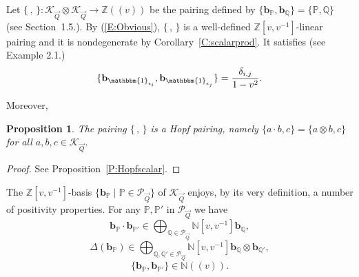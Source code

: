 \documentclass[a4paper,10pt]{amsart}
\def\Z{\mathbb{Z}}
\def\N{\mathbb{N}}
\newtheorem{prop}[theo]{Proposition}
\numberwithin{equation}{section}
\begin{document}
\vspace{.1in}

Let $\{\,,\,\}: \mathcal{K}_{\vec{Q}} \otimes \mathcal{K}_{\vec{Q}} \to \Z((v))$ be the pairing defined by $\{\mathbf{b}_{\mathbb{P}}, \mathbf{b}_{\mathbb{Q}}\}=\{\mathbb{P}, \mathbb{Q}\}$ (see Section~1.5.). By (\ref{E:Obvious}), $\{\,,\,\}$ is a well-defined $\Z[v,v^{-1}]$-linear pairing and it is nondegenerate by Corollary~\ref{C:scalarprod}. It satisfies (see Example 2.1.)
\begin{equation}\label{E:22n}
\{ \mathbf{b}_{\mathbbm{1}_{\epsilon_i}},  \mathbf{b}_{\mathbbm{1}_{\epsilon_j}}\}=\frac{\delta_{i,j}}{1-v^2}.
\end{equation}

Moreover,

\vspace{.1in}

\begin{prop}\label{P:Hopfpairing} The pairing $\{\,,\,\}$ is a Hopf pairing, namely $\{a\cdot b, c\}=\{a \otimes b, c\}$ for all $a,b,c \in \mathcal{K}_{\vec{Q}}$.\end{prop}
\begin{proof} See Proposition~\ref{P:Hopfscalar}.\end{proof}

\vspace{.1in}

The $\Z[v,v^{-1}]$-basis $\{\mathbf{b}_{\mathbb{P}}\;|\; \mathbb{P} \in \mathcal{P}_{\vec{Q}}\}$ of $\mathcal{K}_{\vec{Q}}$ enjoys, by its very definition, a number of positivity properties. For any $\mathbb{P}, \mathbb{P}'$ in $\mathcal{P}_{\vec{Q}}$ we have
\begin{equation}\label{E:Posmult}
\mathbf{b}_{\mathbb{P}} \cdot \mathbf{b}_{\mathbb{P}'} \in \bigoplus_{\mathbb{Q} \in \mathcal{P}_{\vec{Q}}} \N[v,v^{-1}] \mathbf{b}_{\mathbb{Q}},
\end{equation}
\begin{equation}\label{E:Poscop}
\Delta(\mathbf{b}_{\mathbb{P}} ) \in \bigoplus_{\mathbb{Q}, \mathbb{Q}' \in \mathcal{P}_{\vec{Q}}} \N[v,v^{-1}] \mathbf{b}_{\mathbb{Q}} \otimes \mathbf{b}_{\mathbb{Q}'},
\end{equation}
\begin{equation}\label{E:Posscal}
\{\mathbf{b}_{\mathbb{P}},\mathbf{b}_{\mathbb{P}'}\} \in \N((v)).
\end{equation}

\vspace{.15in}
\end{document}
